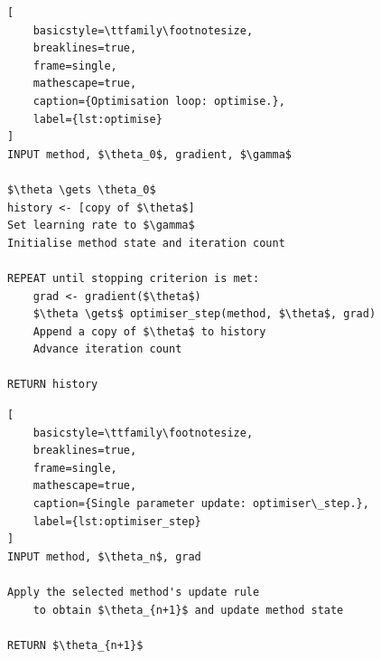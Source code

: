\documentclass[aps,rmp,reprint,raggedbottom,amsmath,amssymb,longbibliography]{revtex4-1}
\begin{document}
\noindent\begin{minipage}{\linewidth}
\begin{lstlisting}[
    basicstyle=\ttfamily\footnotesize,
    breaklines=true,
    frame=single,
    mathescape=true,
    caption={Optimisation loop: optimise.},
    label={lst:optimise}
]
INPUT method, $\theta_0$, gradient, $\gamma$

$\theta \gets \theta_0$
history <- [copy of $\theta$]
Set learning rate to $\gamma$
Initialise method state and iteration count

REPEAT until stopping criterion is met:
    grad <- gradient($\theta$)
    $\theta \gets$ optimiser_step(method, $\theta$, grad)
    Append a copy of $\theta$ to history
    Advance iteration count

RETURN history
\end{lstlisting}
\end{minipage}

\noindent\begin{minipage}{\linewidth}
\begin{lstlisting}[
    basicstyle=\ttfamily\footnotesize,
    breaklines=true,
    frame=single,
    mathescape=true,
    caption={Single parameter update: optimiser\_step.},
    label={lst:optimiser_step}
]
INPUT method, $\theta_n$, grad

Apply the selected method's update rule
    to obtain $\theta_{n+1}$ and update method state

RETURN $\theta_{n+1}$
\end{lstlisting}
\end{minipage}
\end{document}
